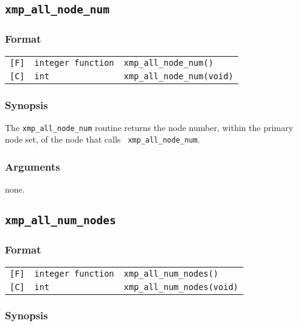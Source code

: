 \subsection{\tt xmp\_all\_node\_num}

\subsubsection*{Format}

\begin{tabular}{lll}

\verb![F]!&  {\tt integer function}& {\tt xmp\_all\_node\_num()}\\

\verb![C]!&  {\tt int}& {\tt xmp\_all\_node\_num(void)}

\end{tabular}

\subsubsection*{Synopsis}

     The {\tt xmp\_all\_node\_num} routine returns the node number,
     within the primary node set, of the node that calls {\tt
     xmp\_all\_node\_num}.

\subsubsection*{Arguments}

    none.


\subsection{\tt xmp\_all\_num\_nodes}

\subsubsection*{Format}

\begin{tabular}{lll}

\verb![F]!&  {\tt integer function}& {\tt xmp\_all\_num\_nodes()}\\

\verb![C]!&  {\tt int}& {\tt xmp\_all\_num\_nodes(void)}

\end{tabular}

\subsubsection*{Synopsis}

